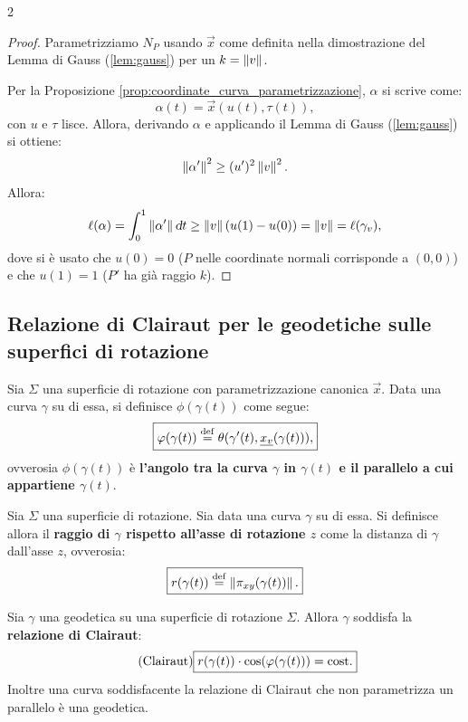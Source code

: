 \begin{multicols*}{2}
    \begin{proof}
        Parametrizziamo $N_P$ usando $\vec{x}$ come definita nella dimostrazione del
        Lemma di Gauss (\ref{lem:gauss}) per un $k = \norm{v}$. \smallskip

        Per la Proposizione \ref{prop:coordinate_curva_parametrizzazione},
        $\alpha$ si scrive come:
        \[
            \alpha(t) = \vec{x}(u(t), \tau(t)),
        \]
        con $u$ e $\tau$ lisce. Allora, derivando $\alpha$ e applicando il Lemma di Gauss
        (\ref{lem:gauss}) si ottiene:
        \[
            \norm{\alpha'}^2 \geq (u')^2 \norm{v}^2.
        \]
        Allora:
        \[
            \ell(\alpha) = \int_0^1 \norm{\alpha'} \dt \geq \norm{v} (u(1) - u(0)) = \norm{v} = \ell(\gamma_v),
        \]
        dove si è usato che $u(0) = 0$ ($P$ nelle coordinate normali corrisponde a $(0, 0)$) e che
        $u(1) = 1$ ($P'$ ha già raggio $k$).
    \end{proof}

    \subsection{Relazione di Clairaut per le geodetiche sulle superfici di rotazione}

    \begin{definition}
        Sia $\Sigma$ una superficie di rotazione con parametrizzazione
        canonica $\vec{x}$. Data una curva $\gamma$ su
        di essa, si definisce $\phi(\gamma(t))$ come segue:
        \[
            \boxed{\phi(\gamma(t)) \defeq \theta(\gamma'(t), \vec{x_v}(\gamma(t))),}
        \]
        ovverosia $\phi(\gamma(t))$ è \textbf{l'angolo tra la curva $\gamma$ in $\gamma(t)$ e il
            parallelo a cui appartiene $\gamma(t)$}.
    \end{definition}

    \begin{definition}
        Sia $\Sigma$ una superficie di rotazione.
        Sia data una curva $\gamma$ su di
        essa. Si definisce
        allora il \textbf{raggio di $\gamma$ rispetto all'asse di rotazione $z$}
        come la distanza di $\gamma$ dall'asse $z$, ovverosia:
        \[
            \boxed{r(\gamma(t)) \defeq \norm{\pi_{xy}(\gamma(t))}.}
        \]
    \end{definition}

    \begin{proposition}
        Sia $\gamma$ una geodetica su una superficie di rotazione $\Sigma$. Allora
        $\gamma$ soddisfa la \textbf{relazione di Clairaut}:
        \begin{equation} \label{eq:clairaut} \tag{Clairaut}
            \boxed{r(\gamma(t)) \cdot \cos(\phi(\gamma(t))) = \textnormal{cost.}}
        \end{equation}
        Inoltre una curva soddisfacente la relazione di Clairaut che non parametrizza un parallelo è
        una geodetica.
    \end{proposition}


\end{multicols*}
